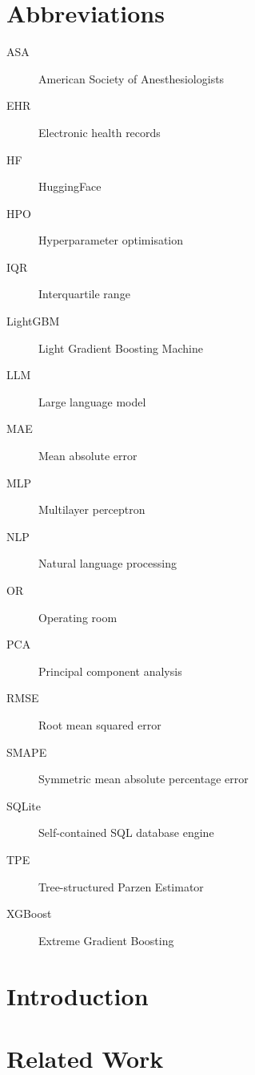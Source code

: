 \documentclass[11pt,twocolumn]{article}
\begin{document}
\section*{Abbreviations}
\begin{description}
    \item[ASA]          American Society of Anesthesiologists
    \item[EHR]          Electronic health records
    \item[HF]           HuggingFace
    \item[HPO]          Hyperparameter optimisation
    \item[IQR]          Interquartile range
    \item[LightGBM]     Light Gradient Boosting Machine
    \item[LLM]          Large language model
    \item[MAE]          Mean absolute error
    \item[MLP]          Multilayer perceptron
    \item[NLP]          Natural language processing
    \item[OR]           Operating room
    \item[PCA]          Principal component analysis
    \item[RMSE]         Root mean squared error
    \item[SMAPE]        Symmetric mean absolute percentage error
    \item[SQLite]       Self-contained SQL database engine
    \item[TPE]          Tree-structured Parzen Estimator
    \item[XGBoost]      Extreme Gradient Boosting
\end{description}

\section{Introduction}\label{sec:introduction}


\section{Related Work}\label{sec:related_work}

\end{document}
